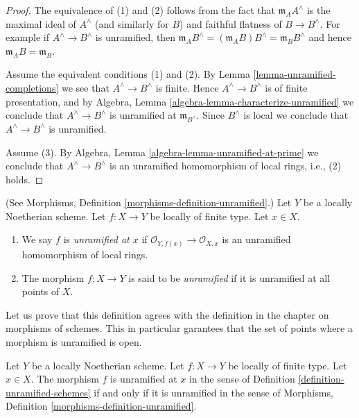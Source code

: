 \begin{proof}
The equivalence of (1) and (2) follows from the fact that
$\mathfrak m_AA^\wedge$ is the maximal ideal of $A^\wedge$
(and similarly for $B$) and faithful flatness of $B \to B^\wedge$.
For example if $A^\wedge \to B^\wedge$ is unramified, then
$\mathfrak m_AB^\wedge = (\mathfrak m_AB)B^\wedge = \mathfrak m_BB^\wedge$
and hence $\mathfrak m_AB = \mathfrak m_B$.

\medskip\noindent
Assume the equivalent conditions (1) and (2).
By Lemma \ref{lemma-unramified-completions}
we see that $A^\wedge \to B^\wedge$ is
finite. Hence $A^\wedge \to B^\wedge$ is of finite presentation, and by
Algebra, Lemma \ref{algebra-lemma-characterize-unramified}
we conclude that $A^\wedge \to B^\wedge$ is unramified at
$\mathfrak m_{B^\wedge}$. Since $B^\wedge$ is local we conclude
that $A^\wedge \to B^\wedge$ is unramified.

\medskip\noindent
Assume (3). By Algebra, Lemma \ref{algebra-lemma-unramified-at-prime}
we conclude that $A^\wedge \to B^\wedge$ is an unramified homomorphism
of local rings, i.e., (2) holds.
\end{proof}

\begin{definition}
\label{definition-unramified-schemes}
(See Morphisms, Definition \ref{morphisms-definition-unramified}.)
Let $Y$ be a locally Noetherian scheme.
Let $f : X \to Y$ be locally of finite type.
Let $x \in X$.
\begin{enumerate}
\item We say $f$ is {\it unramified at $x$} if
$\mathcal{O}_{Y, f(x)} \to \mathcal{O}_{X, x}$
is an unramified homomorphism of local rings.
\item The morphism $f : X \to Y$ is said to be {\it unramified}
if it is unramified at all points of $X$.
\end{enumerate}
\end{definition}

\noindent
Let us prove that this definition agrees with the definition in the
chapter on morphisms of schemes. This in particular garantees that the
set of points where a morphism is unramified is open.

\begin{lemma}
\label{lemma-unramified-defintion}
Let $Y$ be a locally Noetherian scheme.
Let $f : X \to Y$ be locally of finite type.
Let $x \in X$. The morphism $f$ is unramified at $x$ in
the sense of Definition \ref{definition-unramified-schemes}
if and only if it is unramified in
the sense of Morphisms, Definition \ref{morphisms-definition-unramified}.
\end{lemma}

